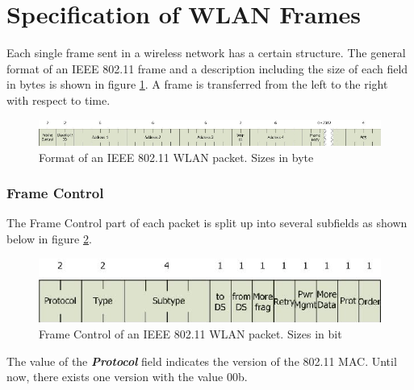 \section{Specification of WLAN Frames}

Each single frame sent in a wireless network has a certain structure. The general format of an IEEE 802.11 frame and a description including the size of each field in bytes is shown in figure \ref{frameformat}. A frame is transferred from the left to the right with respect to time.

\begin{figure}[htbp]
	\vspace{1.5em}
	\begin{center}
		\includegraphics[width=\columnwidth]{graphics/GeneralMACFormat}
	\end{center}
	\vspace{-1em}
	\caption{Format of an IEEE 802.11 WLAN packet. Sizes in byte}
	\label{frameformat}
\end{figure}

\subsubsection{Frame Control}

The Frame Control part of each packet is split up into several subfields as shown below in figure \ref{framecontrol}.

\begin{figure}[htbp]
	\vspace{1.5em}
	\begin{center}
		\includegraphics[width=0.75\columnwidth]{graphics/FrameControl}
	\end{center}
	\vspace{-1em}
	\caption{Frame Control of an IEEE 802.11 WLAN packet. Sizes in bit}
	\vspace{1.5em}
	\label{framecontrol}
\end{figure}

The value of the {\bf{\em Protocol}} field indicates the version of the 802.11 MAC. Until now, there exists one version with the value 00b.

